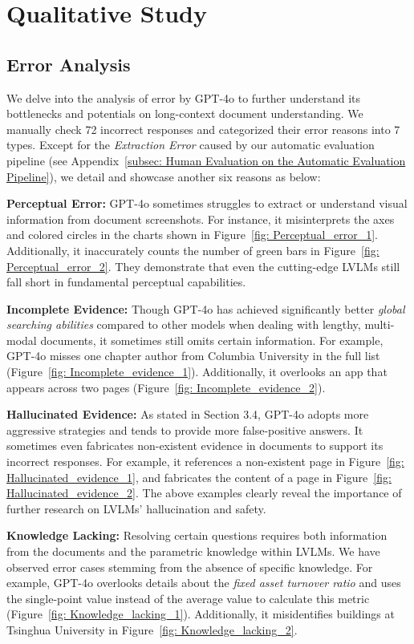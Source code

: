 \section{Qualitative Study}

\subsection{Error Analysis}
\label{appendix: error_analysis}
We delve into the analysis of error by GPT-4o to further understand its bottlenecks and potentials on long-context document understanding. We manually check 72 incorrect responses and categorized their error reasons into 7 types. Except for the \textit{Extraction Error} caused by our automatic evaluation pipeline (see Appendix~\ref{subsec: Human Evaluation on the Automatic Evaluation Pipeline}), we detail and showcase another six reasons as below:

\noindent\textbf{Perceptual Error:} GPT-4o sometimes struggles to extract or understand visual information from document screenshots. For instance, it misinterprets the axes and colored circles in the charts shown in Figure~\ref{fig: Perceptual_error_1}. Additionally, it inaccurately counts the number of green bars in Figure~\ref{fig: Perceptual_error_2}. They demonstrate that even the cutting-edge LVLMs still fall short in fundamental perceptual capabilities.

\noindent\textbf{Incomplete Evidence:} Though GPT-4o has achieved significantly better \textit{global searching abilities} compared to other models when dealing with lengthy, multi-modal documents, it sometimes still omits certain information. For example, GPT-4o misses one chapter author from Columbia University in the full list (Figure~\ref{fig: Incomplete_evidence_1}). Additionally, it overlooks an app that appears across two pages (Figure~\ref{fig: Incomplete_evidence_2}).

\noindent\textbf{Hallucinated Evidence:} As stated in Section 3.4, GPT-4o adopts more aggressive strategies and tends to provide more false-positive answers. It sometimes even fabricates non-existent evidence in documents to support its incorrect responses. For example, it references a non-existent page in Figure~\ref{fig: Hallucinated_evidence_1}, and fabricates the content of a page in Figure~\ref{fig: Hallucinated_evidence_2}. The above examples clearly reveal the importance of further research on LVLMs' hallucination and safety.

\noindent\textbf{Knowledge Lacking:} Resolving certain questions requires both information from the documents and the parametric knowledge within LVLMs. We have observed error cases stemming from the absence of specific knowledge. For example, GPT-4o overlooks details about the \textit{fixed asset turnover ratio} and uses the single-point value instead of the average value to calculate this metric (Figure~\ref{fig: Knowledge_lacking_1}). Additionally, it misidentifies buildings at Tsinghua University in Figure~\ref{fig: Knowledge_lacking_2}.

